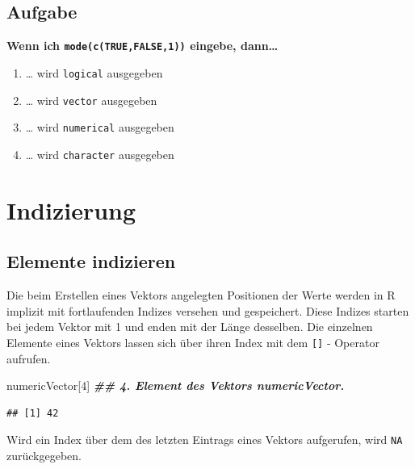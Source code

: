 \documentclass[
]{book}
\newenvironment{Shaded}{\begin{snugshade}}{\end{snugshade}}
\newcommand{\DecValTok}[1]{\textcolor[rgb]{0.00,0.00,0.81}{#1}}
\newcommand{\DocumentationTok}[1]{\textcolor[rgb]{0.56,0.35,0.01}{\textbf{\textit{#1}}}}
\newcommand{\NormalTok}[1]{#1}
\providecommand{\tightlist}{%
  \setlength{\itemsep}{0pt}\setlength{\parskip}{0pt}}
\begin{document}
\hypertarget{aufgabe-2}{%
\subsection{Aufgabe}\label{aufgabe-2}}

\textbf{Wenn ich \texttt{mode(c(\textquotesingle{}TRUE\textquotesingle{},FALSE,1))} eingebe, dann\ldots{}}

\begin{enumerate}
\def\labelenumi{\Alph{enumi})}
\tightlist
\item
  \ldots{} wird \texttt{logical} ausgegeben
\item
  \ldots{} wird \texttt{vector} ausgegeben
\item
  \ldots{} wird \texttt{numerical} ausgegeben
\item
  \ldots{} wird \texttt{character} ausgegeben
\end{enumerate}

\hypertarget{indizierung}{%
\section{Indizierung}\label{indizierung}}

\hypertarget{elemente-indizieren}{%
\subsection{Elemente indizieren}\label{elemente-indizieren}}

Die beim Erstellen eines Vektors angelegten Positionen der Werte werden in R implizit mit fortlaufenden Indizes versehen und gespeichert. Diese Indizes starten bei jedem Vektor mit 1 und enden mit der Länge desselben.
Die einzelnen Elemente eines Vektors lassen sich über ihren Index mit dem \texttt{{[}{]}} - Operator aufrufen.

\begin{Shaded}
\begin{Highlighting}[]
\NormalTok{numericVector[}\DecValTok{4}\NormalTok{] }\DocumentationTok{\#\# 4. Element des Vektors numericVector.}
\end{Highlighting}
\end{Shaded}

\begin{verbatim}
## [1] 42
\end{verbatim}

Wird ein Index über dem des letzten Eintrags eines Vektors aufgerufen, wird \texttt{NA} zurückgegeben.
\end{document}
